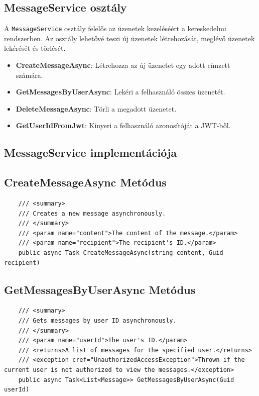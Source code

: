 \documentclass{report}[11pt]
\begin{document}
\subsection{MessageService osztály}

A \texttt{MessageService} osztály felelős az üzenetek kezeléséért a kereskedelmi rendszerben. Az osztály lehetővé teszi új üzenetek létrehozását, meglévő üzenetek lekérését és törlését.

\begin{itemize}
    \item \textbf{CreateMessageAsync}: Létrehozza az új üzenetet egy adott címzett számára.
    \item \textbf{GetMessagesByUserAsync}: Lekéri a felhasználó összes üzenetét.
    \item \textbf{DeleteMessageAsync}: Törli a megadott üzenetet.
    \item \textbf{GetUserIdFromJwt}: Kinyeri a felhasználó azonosítóját a JWT-ből.
\end{itemize}


\subsection{MessageService implementációja}

\subsection*{CreateMessageAsync Metódus}
\begin{lstlisting}
    /// <summary>
    /// Creates a new message asynchronously.
    /// </summary>
    /// <param name="content">The content of the message.</param>
    /// <param name="recipient">The recipient's ID.</param>
    public async Task CreateMessageAsync(string content, Guid recipient)
\end{lstlisting}

\subsection*{GetMessagesByUserAsync Metódus}
\begin{lstlisting}
    /// <summary>
    /// Gets messages by user ID asynchronously.
    /// </summary>
    /// <param name="userId">The user's ID.</param>
    /// <returns>A list of messages for the specified user.</returns>
    /// <exception cref="UnauthorizedAccessException">Thrown if the current user is not authorized to view the messages.</exception>
    public async Task<List<Message>> GetMessagesByUserAsync(Guid userId)
\end{lstlisting}
\end{document}

